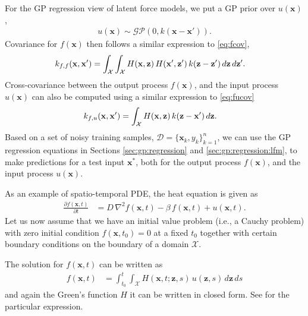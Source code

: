 \documentclass[journal]{IEEEtran}
\begin{document}
For the GP regression view of latent force models, we put a GP prior over $u(\mathbf{x})$,
\begin{align*}
u(\mathbf{x})\sim\mathcal{GP}(0, k(\mathbf{x} - \mathbf{x}')).
\end{align*}
Covariance for $f(\mathbf{x})$ then follows a similar expression to \eqref{eq:fcov},
\begin{equation}
\begin{split}
  k_{f,f}(\mathbf{x}, \mathbf{x}') &=
  \int_{\mathcal{X}}   \int_{\mathcal{X}}
  H(\mathbf{x}, \mathbf{z}) \, H(\mathbf{x}', \mathbf{z}') \, k(\mathbf{z} - \mathbf{z}') \, d\mathbf{z} \, d\mathbf{z}'.
\end{split}
\notag
\end{equation}
Cross-covariance between the output process $f(\mathbf{x})$, and the input process $u(\mathbf{x})$ can also be computed
using a similar expression to \eqref{eq:fucov}
\begin{align}
k_{f,u}(\mathbf{x},\mathbf{x}') & = \int_{\mathcal{X}} H(\mathbf{x}, \mathbf{z})\, k(\mathbf{z} - \mathbf{x}')\, d\mathbf{z}.
\notag
\end{align}
Based on a set of noisy training samples, $\mathcal{D}=\{\mathbf{x}_k, y_k\}_{k=1}^n$, we can
use the GP regression equations in Sections \ref{sec:gp:regression} and \ref{sec:gp:regression:lfm}, to make predictions
for a test input $\mathbf{x}^*$, both for the output process $f(\mathbf{x})$, and the input process $u(\mathbf{x})$.

As an example of spatio-temporal PDE, the heat equation is given as
\begin{align*}
  \frac{\partial f(\mathbf{x},t)}{\partial t} &= D \, \nabla^2 f(\mathbf{x},t) - \beta \, f(\mathbf{x},t) + u(\mathbf{x},t).
\end{align*}
%
Let us now assume that we have an initial value problem (i.e., a Cauchy problem) with zero initial condition $f(\mathbf{x},t_0) = 0$ at a fixed $t_0$ together with certain boundary conditions on the boundary of a domain $\mathcal{X}$. 

The solution for $f(\mathbf{x},t)$ can be written as
\begin{align*}
f(\mathbf{x},t) & = \int_{t_0}^t \int_{\mathcal{X}} H(\mathbf{x}, t;  \mathbf{z}, s)\,
                u(\mathbf{z},s)\,d\mathbf{z}\,ds
\end{align*}
%
and again the Green's function $H$ it can be written in closed form. See \cite{Polyanin:Handbook02} for the particular expression. 
\end{document}
